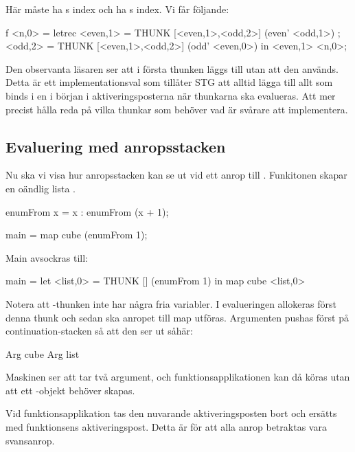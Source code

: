 \documentclass[../Core]{subfiles}
\begin{document}
Här måste  ha s index och  ha s index. Vi får följande:

\begin{codeEx}
f <n,0> = letrec 
    { <even,1> = THUNK [<even,1>,<odd,2>] (even' <odd,1>)
    ; <odd,2>  = THUNK [<even,1>,<odd,2>] (odd' <even,0>)
    } in <even,1> <n,0>;
\end{codeEx}

Den observanta läsaren ser att i första thunken läggs  till utan att den används. 
Detta är ett implementationsval som tillåter STG att alltid lägga till allt som 
binds i en  i början i aktiveringsposterna när thunkarna ska evalueras. 
Att mer precist hålla reda på vilka thunkar som behöver vad är svårare att implementera.




\subsection{Evaluering med anropsstacken}



Nu ska vi visa hur anropsstacken kan se ut vid ett anrop till .
Funkitonen  skapar en oändlig lista \ic{[x, x+1, x+2, ...]}.
 
\begin{codeEx}
enumFrom x = x : enumFrom (x + 1);

main = map cube (enumFrom 1);
\end{codeEx}

Main avsockras till:
\begin{codeEx}
main = let <list,0> = THUNK [] (enumFrom 1)
       in  map cube <list,0>
\end{codeEx}



Notera att -thunken inte har några fria variabler.
I evalueringen allokeras först denna thunk och sedan ska anropet till map
utföras. 
Argumenten pushas först på continuation-stacken så att den ser ut såhär:
\begin{codeEx}
Arg cube
Arg list
\end{codeEx}

Maskinen ser att  tar två argument, och funktionsapplikationen 
kan då köras utan att ett -objekt behöver skapas.

Vid funktionsapplikation tas den nuvarande aktiveringsposten bort och ersätts 
med funktionsens aktiveringspost. Detta är för att alla anrop betraktas vara
svansanrop.
\end{document}
